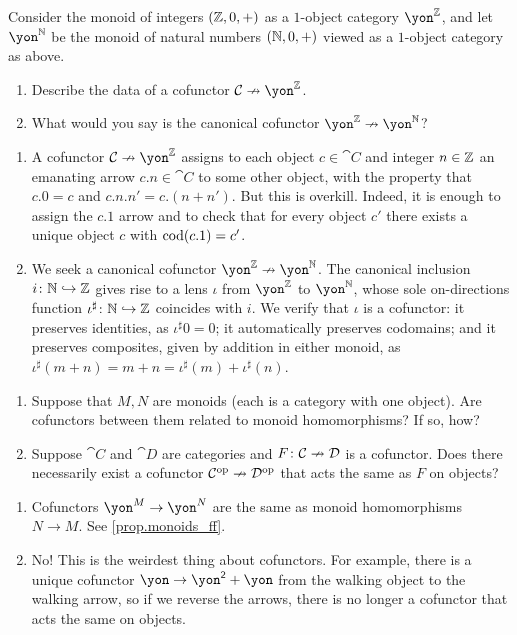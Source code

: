 \documentclass[Book-Poly]{subfiles}
\begin{document}
\begin{exercise}
Consider the monoid of integers $(\mathbb{Z},0,+)$ as a $1$-object category $\yon^\zz$, and let $\yon^\nn$ be the monoid of natural numbers $(\mathbb{N},0,+)$ viewed as a $1$-object category as above.
\begin{enumerate}
	\item Describe the data of a cofunctor $\cat{C}\cof\yon^\zz$.
	\item What would you say is the canonical cofunctor $\yon^\zz\cof\yon^\nn$?
\qedhere
\end{enumerate}
\begin{solution}
\begin{enumerate}
    \item A cofunctor $\cat{C}\cof\yon^\zz$ assigns to each object $c\in\cat{C}$ and integer $n\in\mathbb{Z}$ an emanating arrow $c.n\in\cat{C}$ to some other object, with the property that $c.0=c$ and $c.n.n'=c.(n+n')$. But this is overkill. Indeed, it is enough to assign the $c.1$ arrow and to check that for every object $c'$ there exists a unique object $c$ with $\operatorname{cod}(c.1)=c'$.
    \item We seek a canonical cofunctor $\yon^\zz\cof\yon^\nn$.
    The canonical inclusion $i\colon\mathbb{N}\hookrightarrow\mathbb{Z}$ gives rise to a lens $\iota$ from $\yon^\zz$ to $\yon^\nn$, whose sole on-directions function $\iota^\sharp\colon\mathbb{N}\hookrightarrow\mathbb{Z}$ coincides with $i$. 
    We verify that $\iota$ is a cofunctor: it preserves identities, as $\iota^\sharp0=0$; it automatically preserves codomains; and it preserves composites, given by addition in either monoid, as $\iota^\sharp(m+n)=m+n=\iota^\sharp(m)+\iota^\sharp(n)$.
\end{enumerate}
\end{solution}
\end{exercise}

\begin{exercise}
\begin{enumerate}
	\item Suppose that $M,N$ are monoids (each is a category with one object).
	Are cofunctors between them related to monoid homomorphisms? If so, how?
	\item Suppose $\cat{C}$ and $\cat{D}$ are categories and $F\colon\mathcal{C}\nrightarrow\mathcal{D}$ is a cofunctor.
	Does there necessarily exist a cofunctor $\mathcal{C}^{\textnormal{op}}\nrightarrow\mathcal{D}^{\textnormal{op}}$ that acts the same as $F$ on objects?
\qedhere
\end{enumerate}
\begin{solution}
\begin{enumerate}
    \item Cofunctors $\yon^M\to\yon^N$ are the same as monoid homomorphisms $N\to M$. See \cref{prop.monoids_ff}.
    \item No! This is the weirdest thing about cofunctors. For example, there is a unique cofunctor $\yon\to\yon^\2+\yon$ from the walking object to the walking arrow, so if we reverse the arrows, there is no longer a cofunctor that acts the same on objects.
\end{enumerate}
\end{solution}
\end{exercise}
\end{document}
